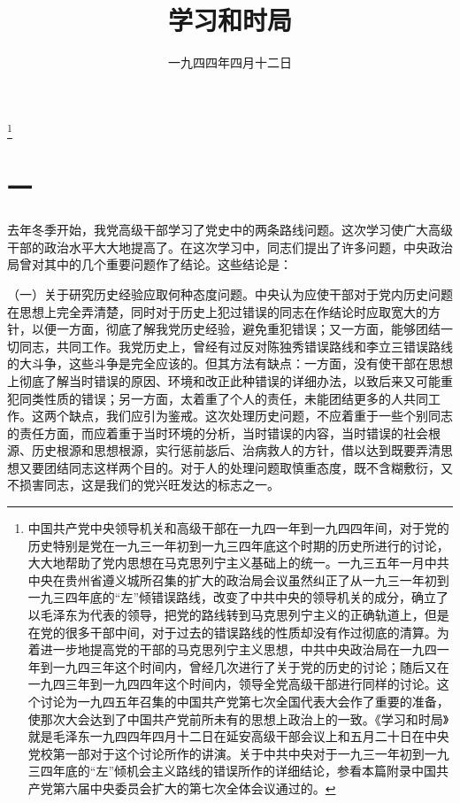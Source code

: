 
\title{学习和时局}
\date{一九四四年四月十二日}
\thanks{中国共产党中央领导机关和高级干部在一九四一年到一九四四年间，对于党的历史特别是党在一九三一年初到一九三四年底这个时期的历史所进行的讨论，大大地帮助了党内思想在马克思列宁主义基础上的统一。一九三五年一月中共中央在贵州省遵义城所召集的扩大的政治局会议虽然纠正了从一九三一年初到一九三四年底的“左”倾错误路线，改变了中共中央的领导机关的成分，确立了以毛泽东为代表的领导，把党的路线转到马克思列宁主义的正确轨道上，但是在党的很多干部中间，对于过去的错误路线的性质却没有作过彻底的清算。为着进一步地提高党的干部的马克思列宁主义思想，中共中央政治局在一九四一年到一九四三年这个时间内，曾经几次进行了关于党的历史的讨论；随后又在一九四三年到一九四四年这个时间内，领导全党高级干部进行同样的讨论。这个讨论为一九四五年召集的中国共产党第七次全国代表大会作了重要的准备，使那次大会达到了中国共产党前所未有的思想上政治上的一致。《学习和时局》就是毛泽东一九四四年四月十二日在延安高级干部会议上和五月二十日在中央党校第一部对于这个讨论所作的讲演。关于中共中央对于一九三一年初到一九三四年底的“左”倾机会主义路线的错误所作的详细结论，参看本篇附录中国共产党第六届中央委员会扩大的第七次全体会议通过的。}
\maketitle


\section*{一}

去年冬季开始，我党高级干部学习了党史中的两条路线问题。这次学习使广大高级干部的政治水平大大地提高了。在这次学习中，同志们提出了许多问题，中央政治局曾对其中的几个重要问题作了结论。这些结论是：

（一）关于研究历史经验应取何种态度问题。中央认为应使干部对于党内历史问题在思想上完全弄清楚，同时对于历史上犯过错误的同志在作结论时应取宽大的方针，以便一方面，彻底了解我党历史经验，避免重犯错误；又一方面，能够团结一切同志，共同工作。我党历史上，曾经有过反对陈独秀错误路线和李立三错误路线的大斗争，这些斗争是完全应该的。但其方法有缺点：一方面，没有使干部在思想上彻底了解当时错误的原因、环境和改正此种错误的详细办法，以致后来又可能重犯同类性质的错误；另一方面，太着重了个人的责任，未能团结更多的人共同工作。这两个缺点，我们应引为鉴戒。这次处理历史问题，不应着重于一些个别同志的责任方面，而应着重于当时环境的分析，当时错误的内容，当时错误的社会根源、历史根源和思想根源，实行惩前毖后、治病救人的方针，借以达到既要弄清思想又要团结同志这样两个目的。对于人的处理问题取慎重态度，既不含糊敷衍，又不损害同志，这是我们的党兴旺发达的标志之一。


